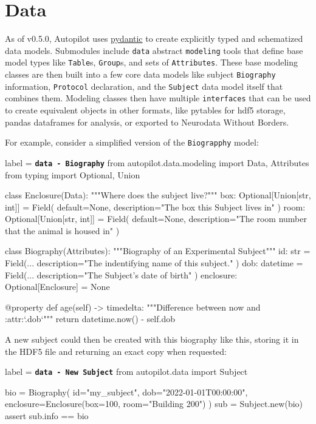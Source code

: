 \section{Data}
\label{sec:datamodel}

As of v0.5.0, Autopilot uses \href{https://pydantic-docs.helpmanual.io/}{pydantic} to create explicitly typed and schematized data models. Submodules include \texttt{data} abstract \texttt{modeling} tools that define base model types like \texttt{Table}s, \texttt{Group}s, and sets of \texttt{Attributes}. These base modeling classes are then built into a few core data models like subject \texttt{Biography} information, \texttt{Protocol} declaration, and the \texttt{Subject} data model itself that combines them. Modeling classes then have multiple \texttt{interfaces} that can be used to create equivalent objects in other formats, like pytables for hdf5 storage, pandas dataframes for analysis, or exported to Neurodata Without Borders.

For example, consider a simplified version of the \texttt{Biograpphy} model:


\begin{pythoncode*}{label = \texttt{\textbf{data - Biography}}}
from autopilot.data.modeling import Data, Attributes
from typing import Optional, Union

class Enclosure(Data):
    """Where does the subject live?"""
    box:  Optional[Union[str, int]] = Field(
        default=None, 
        description="The box this Subject lives in"
    )
    room: Optional[Union[str, int]] = Field(
        default=None, 
        description="The room number that the animal is housed in"
    )

class Biography(Attributes):
    """Biography of an Experimental Subject"""
    id:  str = Field(...
        description="The indentifying name of this subject."
    )
    dob: datetime = Field(... 
        description="The Subject's date of birth"
    )
    enclosure: Optional[Enclosure] = None

    @property
    def age(self) -> timedelta:
        """Difference between now and :attr:`.dob`"""
        return datetime.now() - self.dob
\end{pythoncode*}

A new subject could then be created with this biography like this, storing it in the HDF5 file and returning an exact copy when requested:

\begin{pythoncode*}{label = \texttt{\textbf{data - New Subject}}}
from autopilot.data import Subject

bio = Biography(
    id="my_subject",
    dob="2022-01-01T00:00:00",
    enclosure=Enclosure(box=100, room="Building 200")
)
sub = Subject.new(bio)
assert sub.info == bio
\end{pythoncode*}


